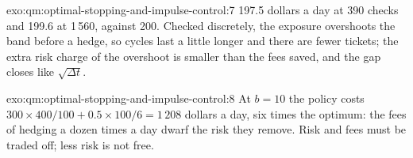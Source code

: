 \begin{solution}{exo:qm:optimal-stopping-and-impulse-control:7}
197.5 dollars a day at 390 checks and 199.6 at 1\,560, against 200. Checked discretely, the exposure overshoots the band before a
hedge, so cycles last a little longer and there are fewer tickets; the extra risk charge of the overshoot is smaller than the fees
saved, and the gap closes like $\sqrt{\Delta t}$.
\end{solution}

\begin{solution}{exo:qm:optimal-stopping-and-impulse-control:8}
At $b = 10$ the policy costs $300 \times 400/100 + 0.5 \times 100/6 = 1\,208$ dollars a day, six times the optimum: the fees of hedging a dozen
times a day dwarf the risk they remove. Risk and fees must be traded off; less risk is not free.
\end{solution}

